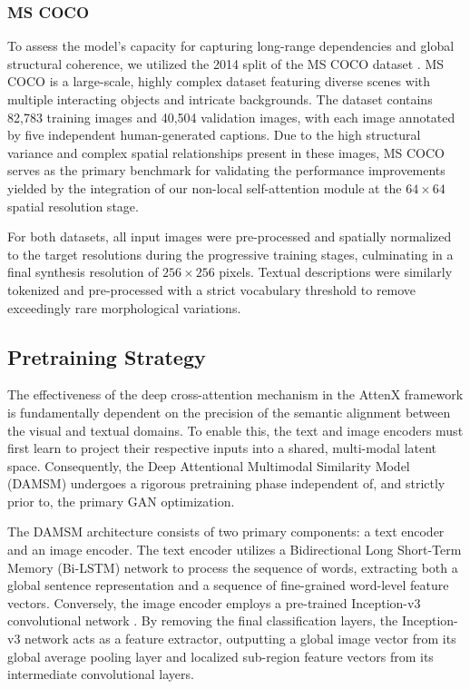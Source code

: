 \documentclass[conference]{IEEEtran}
\begin{document}
\subsubsection{MS COCO}
To assess the model's capacity for capturing long-range dependencies and global structural coherence, we utilized the 2014 split of the MS COCO dataset \cite{lin2014microsoft}. MS COCO is a large-scale, highly complex dataset featuring diverse scenes with multiple interacting objects and intricate backgrounds. The dataset contains 82,783 training images and 40,504 validation images, with each image annotated by five independent human-generated captions. Due to the high structural variance and complex spatial relationships present in these images, MS COCO serves as the primary benchmark for validating the performance improvements yielded by the integration of our non-local self-attention module at the $64 \times 64$ spatial resolution stage.

For both datasets, all input images were pre-processed and spatially normalized to the target resolutions during the progressive training stages, culminating in a final synthesis resolution of $256 \times 256$ pixels. Textual descriptions were similarly tokenized and pre-processed with a strict vocabulary threshold to remove exceedingly rare morphological variations.

\subsection{Pretraining Strategy}

The effectiveness of the deep cross-attention mechanism in the AttenX framework is fundamentally dependent on the precision of the semantic alignment between the visual and textual domains. To enable this, the text and image encoders must first learn to project their respective inputs into a shared, multi-modal latent space. Consequently, the Deep Attentional Multimodal Similarity Model (DAMSM) \cite{xu2018attngan} undergoes a rigorous pretraining phase independent of, and strictly prior to, the primary GAN optimization.

The DAMSM architecture consists of two primary components: a text encoder and an image encoder. The text encoder utilizes a Bidirectional Long Short-Term Memory (Bi-LSTM) network \cite{schuster1997bidirectional} to process the sequence of words, extracting both a global sentence representation and a sequence of fine-grained word-level feature vectors. Conversely, the image encoder employs a pre-trained Inception-v3 convolutional network \cite{szegedy2016rethinking}. By removing the final classification layers, the Inception-v3 network acts as a feature extractor, outputting a global image vector from its global average pooling layer and localized sub-region feature vectors from its intermediate convolutional layers.
\end{document}
